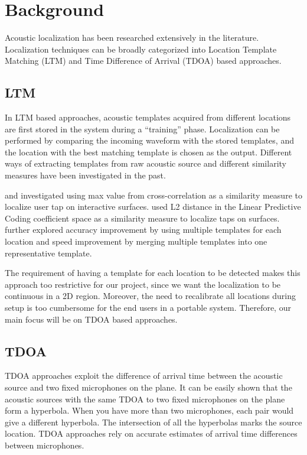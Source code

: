 \section{Background}
Acoustic localization has been researched extensively in the literature. Localization techniques can be broadly categorized into Location Template Matching (LTM) and Time Difference of Arrival (TDOA) based approaches.

\subsection{LTM}
In LTM based approaches, acoustic templates acquired from different locations are first stored in the system during a ``training'' phase. Localization can be performed by comparing the incoming waveform with the stored templates, and the location with the best matching template is chosen as the output. Different ways of extracting templates from raw acoustic source and different similarity measures have been investigated in the past. 

\cite{extended:tusi} and \cite{ltm:pham} investigated using max value from cross-correlation as a similarity measure to localize user tap on interactive surfaces. \cite{ltm:lpc} used L2 distance in the Linear Predictive Coding coefficient space as a similarity measure to localize taps on surfaces. \cite{ltm:tusi2} further explored accuracy improvement by using multiple templates for each location and speed improvement by merging multiple templates into one representative template.

The requirement of having a template for each location to be detected makes this approach too restrictive for our project, since we want the localization to be continuous in a 2D region.  Moreover, the need to recalibrate all locations during setup is too cumbersome for the end users in a portable system. Therefore, our main focus will be on TDOA based approaches.

\subsection{TDOA}
TDOA approaches exploit the difference of arrival time between the acoustic source and two fixed microphones on the plane. It can be easily shown that the acoustic sources with the same TDOA to two fixed microphones on the plane form a hyperbola. When you have more than two microphones, each pair would give a different hyperbola. The intersection of all the hyperbolas marks the source location. TDOA approaches rely on accurate estimates of arrival time differences between microphones. 


